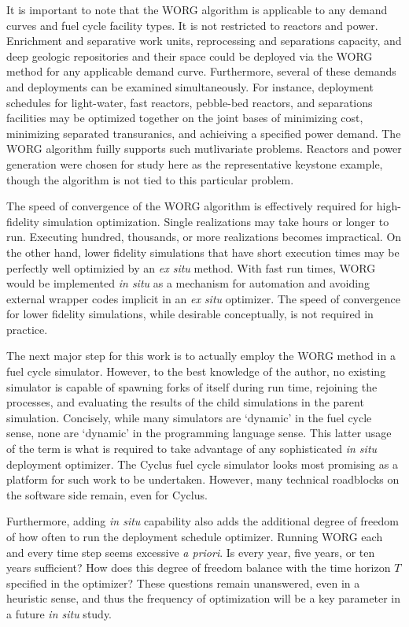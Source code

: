 It is important to note that the WORG algorithm is applicable to any
demand curves and fuel cycle facility types. It is not restricted to
reactors and power. Enrichment and separative work units, reprocessing
and separations capacity, and deep geologic repositories and their
space could be deployed via the WORG method for any applicable demand
curve. Furthermore, several of these demands and deployments can be
examined simultaneously. For instance, deployment schedules for light-water,
fast reactors, pebble-bed reactors, and separations facilities may be optimized
together on the joint
bases of minimizing cost, minimizing separated transuranics, and achieiving
a specified power demand. The WORG algorithm fuilly supports such mutlivariate
problems. Reactors and power generation were chosen for study here as the
representative keystone example, though the algorithm is not tied to this
particular problem.

The speed of convergence of the WORG algorithm is effectively required for
high-fidelity simulation optimization. Single realizations may take hours or
longer to run. Executing hundred, thousands, or more realizations becomes
impractical. On the other hand, lower fidelity simulations that have short
execution times may be perfectly well optimizied by an \emph{ex situ}
method. With fast run times, WORG would be implemented \emph{in situ} as
a mechanism for automation and avoiding external wrapper codes implicit
in an \emph{ex situ} optimizer. The speed of convergence for lower fidelity
simulations, while desirable conceptually, is not required in practice.

The next major step for this work is to actually employ the WORG method in
a fuel cycle simulator.  However, to the best knowledge of the
author, no existing simulator is capable of spawning forks of itself
during run time, rejoining the processes, and evaluating the results of the
child simulations in the parent simulation. Concisely, while many simulators
are `dynamic' in the fuel cycle sense, none are `dynamic' in the programming
language sense. This latter usage of the term is what is required to
take advantage of any sophisticated \emph{in situ} deployment optimizer.
The Cyclus fuel cycle simulator looks most promising as a platform
for such work to be undertaken. However, many technical roadblocks
on the software side remain, even for Cyclus.

Furthermore, adding \emph{in situ} capability also adds the additional
degree of freedom of how often to run the deployment schedule optimizer.
Running WORG each and every
time step seems excessive \emph{a priori}. Is every year, five years,
or ten years sufficient? How does this degree of freedom balance with the
time horizon $T$ specified in the optimizer? These questions remain unanswered, even
in a heuristic sense, and thus the frequency of optimization will be a key
parameter in a future \emph{in situ} study.
